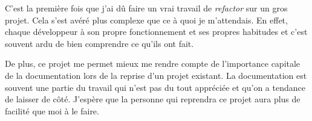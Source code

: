 C'est la première fois que j'ai dû faire un vrai travail de \emph{refactor} sur un gros projet. Cela s'est avéré plus complexe que ce à quoi je m'attendais. En effet, chaque développeur à son propre fonctionnement et ses propres habitudes et c'est souvent ardu de bien comprendre ce qu'ils ont fait.

De plus, ce projet me permet mieux me rendre compte de l'importance capitale de la documentation lors de la reprise d'un projet existant. La documentation est souvent une partie du travail qui n'est pas du tout appréciée et qu'on a tendance de laisser de côté. J'espère que la personne qui reprendra ce projet aura plus de facilité que moi à le faire.


\vfil
\hspace{8cm}\makeatletter\@author\makeatother\par
\hspace{8cm}\begin{minipage}{5cm}
    \printsignature
\end{minipage}